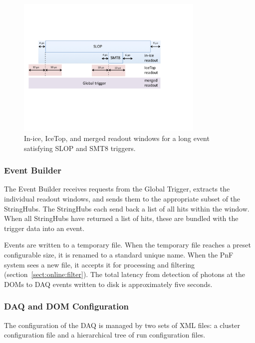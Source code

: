 \begin{figure}[!ht]
 \centering
 \includegraphics[width=0.8\textwidth]{graphics/online/trigger/trigger_readout}
 \caption{In-ice, IceTop, and merged readout windows for a long event
   satisfying SLOP and SMT8 triggers.}
 \label{fig:trigger_readout}
\end{figure}

\subsubsection{\label{sect:online:evbuilder}Event Builder}

The Event Builder receives requests from the Global Trigger, extracts the
individual readout windows, and sends them to the appropriate subset of the
StringHubs.  The StringHubs each send back a list of all hits within the
window. When all StringHubs have returned a list of hits, these are bundled with the trigger data into an event.

Events are written to a temporary file.  When the temporary file
reaches a preset configurable size, it is renamed to a standard unique name.  When the PnF
system sees a new file, it accepts it for processing and filtering
(section~\ref{sect:online:filter}).  The total latency from detection of
photons at the DOMs to DAQ events written to disk is approximately five
seconds. 

\subsubsection{\label{sect:online:daqdomconfig}DAQ and DOM Configuration}

The configuration of the DAQ is managed by two sets of XML files: a cluster
configuration file and a hierarchical tree of run configuration files.


